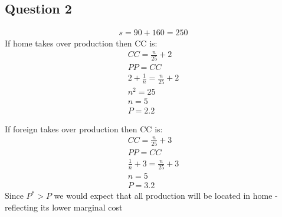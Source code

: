\documentclass{article}
\begin{document}
\par \vspace{0.8em}
\subsection{Question 2}

\begin{gather*}
  s = 90 + 160 = 250
\end{gather*}
If home takes over production then CC is:
\begin{gather*}
  CC = \frac{n}{25} + 2 \\
  PP = CC \\
  2 + \frac{1}{n} = \frac{n}{25} + 2 \\
  n^{2} = 25 \\
  n = 5 \\
  P = 2.2
\end{gather*}

If foreign takes over production then CC is:
\begin{gather*}
  CC = \frac{n}{25} + 3 \\
  PP = CC \\
  \frac{1}{n} + 3 = \frac{n}{25} + 3 \\
  n = 5 \\
  P = 3.2
\end{gather*}
Since $P^{*} > P$ we would expect that all production will be located in home - reflecting its lower marginal cost
\end{document}

